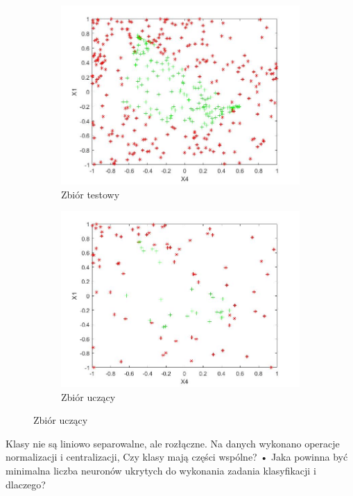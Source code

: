 \begin{figure}
\centering
\begin{subfigure}{.5\textwidth}
  \centering
  \includegraphics[width=\linewidth]{assets/test.jpg}
  \caption{Zbiór testowy}
  \label{fig:sub1}
\end{subfigure}%
\begin{subfigure}{.5\textwidth}
  \centering
  \includegraphics[width=\linewidth]{assets/train.jpg}
  \caption{Zbiór uczący}
  \label{fig:sub2}
\end{subfigure}
\label{fig:test}
\end{figure}
\FloatBarrier
Klasy nie są liniowo separowalne, ale 
rozłączne. Na danych wykonano operacje normalizacji i centralizacji,
Czy klasy mają części wspólne?
• Jaka powinna być minimalna liczba neuronów
ukrytych do wykonania zadania klasyfikacji i
dlaczego?
